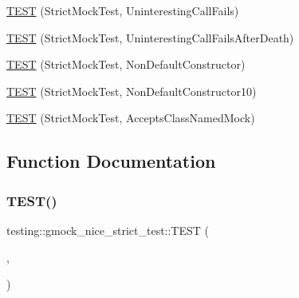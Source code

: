 \begin{DoxyCompactItemize}
\hyperlink{namespacetesting_1_1gmock__nice__strict__test_afea105507ce78fc0e2c20d9f4cca16d7}{T\+E\+ST} (Strict\+Mock\+Test, Uninteresting\+Call\+Fails)
\item 
\hyperlink{namespacetesting_1_1gmock__nice__strict__test_a04e9402fd03549e1eda88659b6eac174}{T\+E\+ST} (Strict\+Mock\+Test, Uninteresting\+Call\+Fails\+After\+Death)
\item 
\hyperlink{namespacetesting_1_1gmock__nice__strict__test_a21456158013d707a1238d0ade00ea3f6}{T\+E\+ST} (Strict\+Mock\+Test, Non\+Default\+Constructor)
\item 
\hyperlink{namespacetesting_1_1gmock__nice__strict__test_ae52f11a6045e9c307237cf02b85e6b79}{T\+E\+ST} (Strict\+Mock\+Test, Non\+Default\+Constructor10)
\item 
\hyperlink{namespacetesting_1_1gmock__nice__strict__test_a4534bdd7c8ca19aad56933d34e0ea4db}{T\+E\+ST} (Strict\+Mock\+Test, Accepts\+Class\+Named\+Mock)
\end{DoxyCompactItemize}


\subsection{Function Documentation}
\mbox{\label{namespacetesting_1_1gmock__nice__strict__test_a12b9f686345faa5a646da65a67c38a44}} 
\subsubsection{\texorpdfstring{T\+E\+S\+T()}{TEST()}\hspace{0.1cm}{\footnotesize\ttfamily [1/17]}}
{\footnotesize\ttfamily testing\+::gmock\+\_\+nice\+\_\+strict\+\_\+test\+::\+T\+E\+ST (\begin{DoxyParamCaption}\item[{Nice\+Mock\+Test}]{,  }\item[{Allows\+Expected\+Call}]{ }\end{DoxyParamCaption})}

\mbox{\label{namespacetesting_1_1gmock__nice__strict__test_a2bad58b3a12ea95eb4a731026c576b40}} 
